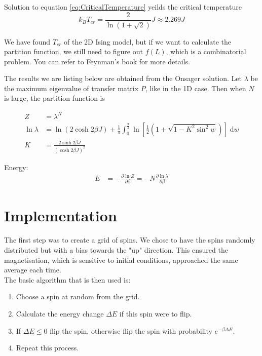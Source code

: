 \documentclass[11pt]{article}
\newcommand{\vd}{\mathrm{d}} %
\begin{document}
	Solution to equation \eqref{eq:CriticalTemperature} yeilds the critical temperature
	\begin{equation} \label{eq:CriticalTemperature}
		k_B T_{cr} = \frac{2}{\ln(1+\sqrt{2})}J \approx 2.269J
	\end{equation}

	We have found $T_{cr}$ of the 2D Ising model, but if we want to calculate the partition function,
	we still need to figure out $f(L)$, which is a combinatorial problem.
	You can refer to Feynman's book\cite{feynman1972statistical} for more details.

	The results we are listing below are obtained from the Onsager solution\cite{onsager_solution}.
	Let $\lambda$ be the maximum eigenvalue of transfer matrix $P$, like in the 1D case.
	Then when $N$ is large, the partition function is

	\begin{equation}
		\begin{split}
			Z &= \lambda^N \\
			\ln{\lambda} &= \ln{\left(2 \cosh{2\beta J}\right)} + \frac{1}{\pi}\int_0^{\frac{\pi}{2}} \ln{\left[\frac{1}{2}\left(1 + \sqrt{1 - K^2\sin^2{w}}\right)\right]\;\vd w} \\
			K &= \frac{2\sinh{2\beta J}}{\left(\cosh{2\beta J}\right)^2}
		\end{split}
	\end{equation}
	
	Energy:
	\begin{equation}
		\begin{split}
			E &= - \frac{\partial \ln{Z}}{\partial \beta} = -N\frac{\partial \ln{\lambda}}{\partial \beta}
		\end{split}
	\end{equation}
	\section{Implementation}
	
	The first step was to create a grid of spins. We chose to have the spins randomly distributed but with a bias towards the "up" direction. This ensured the magnetisation, which is sensitive to initial conditions, approached the same average each time.\\
	
	The basic algorithm that is then used is:
	\begin{enumerate}
		\item Choose a spin at random from the grid.
		\item Calculate the energy change $\Delta E$ if this spin were to flip.
		\item If $\Delta E \leq 0$ flip the spin, otherwise flip the spin with probability $e^{-\beta\Delta E}$.
		\item Repeat this process.
	\end{enumerate}
	
\end{document}
